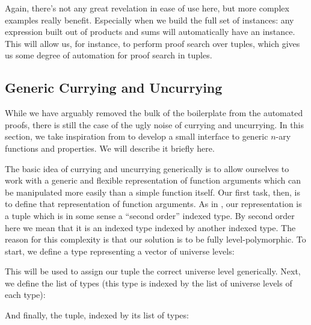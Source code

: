 Again, there's not any great revelation in ease of use here, but more complex
examples really benefit.
Especially when we build the full set of instances: any expression built out of
products and sums will automatically have an instance.
This will allow us, for instance, to perform proof search over tuples, which
gives us some degree of automation for proof search in tuples.
\begin{agdalisting}
\end{agdalisting}
\subsection{Generic Currying and Uncurrying}
While we have arguably removed the bulk of the boilerplate from the automated
proofs, there is still the case of the ugly noise of currying and uncurrying.
In this section, we take inspiration from
\citet{allaisGenericLevelPolymorphic2019} to develop a small interface to generic
\(n\)-ary functions and properties.
We will describe it briefly here.

The basic idea of currying and uncurrying generically is to allow ourselves to
work with a generic and flexible representation of function arguments which can
be manipulated more easily than a simple function itself.
Our first task, then, is to define that representation of function arguments.
As in \citet{allaisGenericLevelPolymorphic2019}, our representation is a tuple
which is in some sense a ``second order'' indexed type.
By second order here we mean that it is an indexed type indexed by another
indexed type.
The reason for this complexity is that our solution is to be fully
level-polymorphic.
To start, we define a type representing a vector of universe levels:

\begin{minipage}{\linewidth}
  \begin{multicols}{2}
    \begin{agdalisting}
    \end{agdalisting} \columnbreak
    \begin{agdalisting}
    \end{agdalisting}
  \end{multicols}
\end{minipage}

This will be used to assign our tuple the correct universe level generically.
Next, we define the list of types (this type is indexed by the list of universe
levels of each type):
\begin{agdalisting}
\end{agdalisting}
And finally, the tuple, indexed by its list of types:

